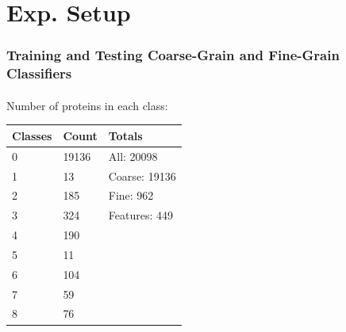 \documentclass{beamer}
\begin{document}
\section{Exp. Setup}
\begin{frame}
    \frametitle{Training and Testing Coarse-Grain and Fine-Grain Classifiers}
    \framesubtitle{}
    \par Number of proteins in each class:
    \begin{table}[H]
      \centering
        \label{tab:ClassesAll}

      \begin{tabular}{|l|l||l|}\hline
        Classes & Count & Totals \\ \hline
        0 & 19136 & All: 20098 \\
        1 & 13 & Coarse: 19136 \\
        2 & 185 & Fine: 962 \\
        3 & 324 & Features: 449 \\
        4 & 190 & \\
        5 & 11 &  \\
        6 & 104  & \\
        7 & 59  & \\
        8 & 76  & \\ \hline
      \end{tabular}%
    \end{table}
\end{frame}
\end{document}

